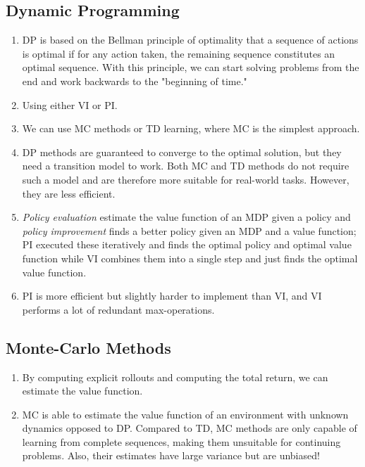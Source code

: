 		\subsection{Dynamic Programming}
			\begin{enumerate}
				\item \ac{DP} is based on the Bellman principle of optimality that a sequence of actions is optimal if for any action taken, the remaining sequence constitutes an optimal sequence. With this principle, we can start solving problems from the end and work backwards to the "beginning of time."
				\item Using either \ac{VI} or \ac{PI}.
				\item We can use \ac{MC} methods or \ac{TD} learning, where \ac{MC} is the simplest approach.
				\item \ac{DP} methods are guaranteed to converge to the optimal solution, but they need a transition model to work. Both \ac{MC} and \ac{TD} methods do not require such a model and are therefore more suitable for real-world tasks. However, they are less efficient.
				\item \emph{Policy evaluation} estimate the value function of an \ac{MDP} given a policy and \emph{policy improvement} finds a better policy given an \ac{MDP} and a value function; \ac{PI} executed these iteratively and finds the optimal policy and optimal value function while \ac{VI} combines them into a single step and just finds the optimal value function.
				\item \ac{PI} is more efficient but slightly harder to implement than \ac{VI}, and \ac{VI} performs a lot of redundant max-operations.
			\end{enumerate}

		\subsection{Monte-Carlo Methods}
			\begin{enumerate}
				\item By computing explicit rollouts and computing the total return, we can estimate the value function.
				\item \ac{MC} is able to estimate the value function of an environment with unknown dynamics opposed to \ac{DP}. Compared to \ac{TD}, \ac{MC} methods are only capable of learning from complete sequences, making them unsuitable for continuing problems. Also, their estimates have large variance but are unbiased!
			\end{enumerate}

